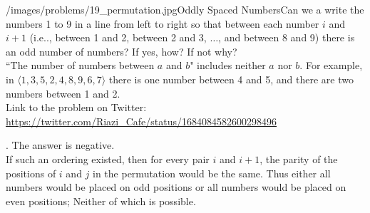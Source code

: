 \begin{problem}{/images/problems/19_permutation.jpg}{Oddly Spaced Numbers}Can we a write the numbers 1 to 9 in a line from left to right  so that between each number $i$ and $i+1$ (i.e.., between 1 and 2, between 2 and 3, $\ldots$, and between 8 and 9) there is an odd number of numbers? If yes, how? If not why?\\[0.2cm]

``The number of numbers between $a$ and $b$" includes neither $a$ nor $b$. For example, in $\langle 1,3,5,2,4,8,9,6,7 \rangle$ there is one number between 4 and 5, and there are two numbers between 1 and 2.\\[0.2cm]

Link to the problem on Twitter:  \url{https://twitter.com/Riazi_Cafe/status/1684084582600298496}\end{problem}
\begin{solution}.
The answer is negative.\\[0.2cm]

If such an ordering existed, then for every pair $i$ and $i+1$, the parity of the positions of $i$ and $j$ in the permutation would be the same. Thus either all numbers would be placed on odd positions or all numbers would be placed on even positions; Neither of which is  possible.
\end{solution}
